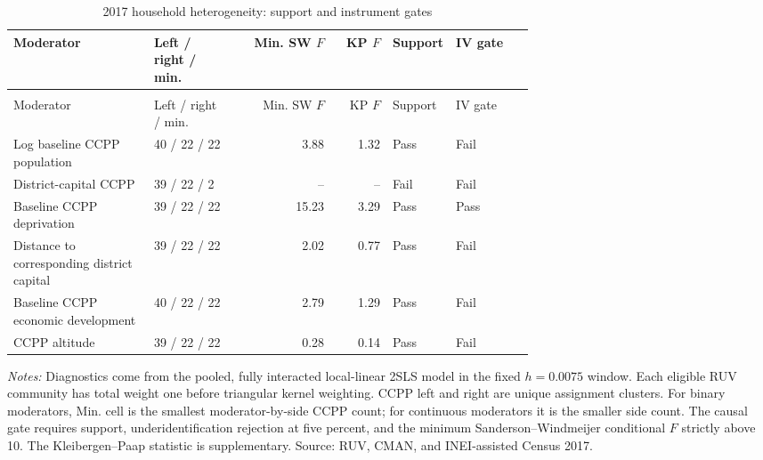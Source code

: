 \begingroup\fontsize{9.25}{11.4}\selectfont
\setlength{\tabcolsep}{3pt}\renewcommand{\arraystretch}{1.18}
\begin{longtable}{@{}>{\raggedright\arraybackslash}p{0.27\linewidth}p{0.16\linewidth}rrp{0.10\linewidth}p{0.15\linewidth}@{}}
\caption{2017 household heterogeneity: support and instrument gates}\label{tab:pub_A09} \\
\toprule Moderator & Left / right / min. & Min. SW \(F\) & KP \(F\) & Support & IV gate \\ \midrule\endfirsthead
\multicolumn{6}{c}{\tablename\ \thetable{} -- continued} \\
\toprule Moderator & Left / right / min. & Min. SW \(F\) & KP \(F\) & Support & IV gate \\ \midrule\endhead
Log baseline CCPP population & 40 / 22 / 22 & 3.88 & 1.32 & Pass & Fail \\
District-capital CCPP & 39 / 22 / 2 & -- & -- & Fail & Fail \\
Baseline CCPP deprivation & 39 / 22 / 22 & 15.23 & 3.29 & Pass & Pass \\
Distance to corresponding district capital & 39 / 22 / 22 & 2.02 & 0.77 & Pass & Fail \\
Baseline CCPP economic development & 40 / 22 / 22 & 2.79 & 1.29 & Pass & Fail \\
CCPP altitude & 39 / 22 / 22 & 0.28 & 0.14 & Pass & Fail \\
\bottomrule\end{longtable}
\parbox{0.97\linewidth}{\footnotesize \textit{Notes:} Diagnostics come from the pooled, fully interacted local-linear 2SLS model in the fixed \(h=0.0075\) window. Each eligible RUV community has total weight one before triangular kernel weighting. CCPP left and right are unique assignment clusters. For binary moderators, Min. cell is the smallest moderator-by-side CCPP count; for continuous moderators it is the smaller side count. The causal gate requires support, underidentification rejection at five percent, and the minimum Sanderson--Windmeijer conditional \(F\) strictly above 10. The Kleibergen--Paap statistic is supplementary. Source: RUV, CMAN, and INEI-assisted Census 2017.}
\par{}\par\endgroup
